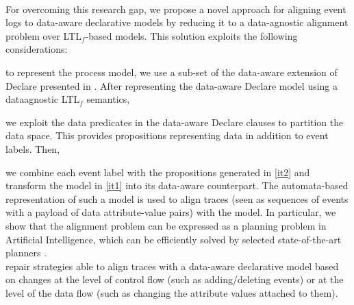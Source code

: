 \\
\indent
For overcoming this research gap, we propose a novel approach for aligning event logs to data-aware declarative models by reducing it to a data-agnostic alignment problem over LTL$_f$-based models. This solution exploits the following considerations: \begin{enumerate*}[label=\emph{\alph*})]
	\item \label{it1} to represent the process model, we use a sub-set of the data-aware extension of Declare presented in \cite{BurattinMS16}. After representing the data-aware Declare model using a data\added{-}agnostic LTL$_f$ semantics,
	\item \label{it2} we exploit the data predicates in the data-aware Declare clauses to partition the data space. This provides propositions representing data in addition to event labels. Then,
	\item we combine each event label with the propositions generated in \ref{it2} and transform the model in \ref{it1} into its data-aware counterpart. The automata-based representation of such a model is used to align traces (seen as sequences of events with a payload of data attribute-value pairs) with the model.
In particular, we show that the alignment problem can be expressed as a planning problem in Artificial Intelligence, which can be efficiently solved by selected state-of-the-art planners \cite{XuLZ17a,Marrella17}.
%
\\
\indent
{}
%
%
 repair strategies able to align traces with a data-aware declarative model based on changes at the level of control flow (such as adding/deleting events) or at the level of the data flow (such as changing the attribute values attached to them).
\end{enumerate*}

